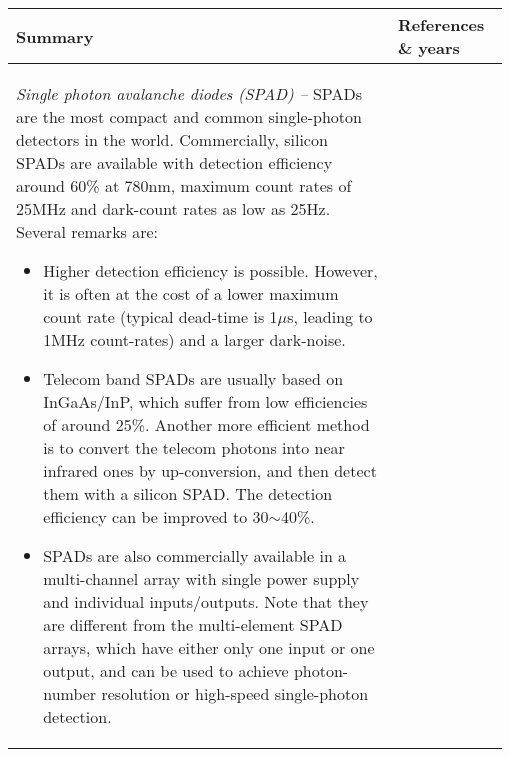 \begin{table*}[!htbp]
	\begin{tabular}{|p{0.755\linewidth}|p{0.22\linewidth}|}
		\hline
	\textbf{Summary} & \textbf{References \& years} \\	\hline \hline
		\textit{Single photon avalanche diodes (SPAD) --}
		SPADs are the most compact and common single-photon detectors in the world. Commercially, silicon SPADs are available with detection efficiency around 60\% at 780nm, maximum count rates of 25MHz and dark-count rates as low as 25Hz. Several remarks are:
		
		\begin{itemize}
			
			\item Higher detection efficiency is possible. However, it is often at the cost of a lower maximum count rate (typical dead-time is 1$\mu$s, leading to 1MHz count-rates) and a larger dark-noise.
			
			\item Telecom band SPADs are usually based on InGaAs/InP, which suffer from low efficiencies of around 25\%. Another more efficient method is to convert the telecom photons into near infrared ones by up-conversion, and then detect them with a silicon SPAD. The detection efficiency can be improved to 30$\sim$40\%.
			
			\item SPADs are also commercially available in a multi-channel array with single power supply and individual inputs/outputs. Note that they are different from the multi-element SPAD arrays, which have either only one input or one output, and can be used to achieve photon-number resolution or high-speed single-photon detection.
			

\end{itemize}
\end{tabular}
\end{table*}
